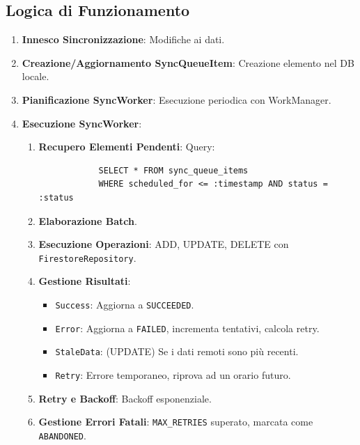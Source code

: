 \documentclass{article}
\begin{document}
\subsection{Logica di Funzionamento}\label{subsec:logica-di-funzionamento}
\begin{enumerate}
    \item \textbf{Innesco Sincronizzazione}: Modifiche ai dati.
    \item \textbf{Creazione/Aggiornamento SyncQueueItem}: Creazione elemento nel
    DB locale.
    \item \textbf{Pianificazione SyncWorker}: Esecuzione periodica con
    WorkManager.
    \item \textbf{Esecuzione SyncWorker}:
        \begin{enumerate}
            \item \textbf{Recupero Elementi Pendenti}: Query:
            \begin{verbatim}
            SELECT * FROM sync_queue_items
            WHERE scheduled_for <= :timestamp AND status = :status
            \end{verbatim}
            \item \textbf{Elaborazione Batch}.
            \item \textbf{Esecuzione Operazioni}: ADD, UPDATE, DELETE con
            \texttt{FirestoreRepository}.
            \item \textbf{Gestione Risultati}:
            \begin{itemize}
                \item \texttt{Success}: Aggiorna a \texttt{SUCCEEDED}.
                \item \texttt{Error}: Aggiorna a \texttt{FAILED}, incrementa
                tentativi, calcola retry.
                \item \texttt{StaleData}: (UPDATE) Se i dati remoti sono più
                recenti.
                \item \texttt{Retry}: Errore temporaneo, riprova ad un orario
                futuro.
            \end{itemize}
            \item \textbf{Retry e Backoff}: Backoff esponenziale.
            \item \textbf{Gestione Errori Fatali}: \texttt{MAX\_RETRIES}
            superato, marcata come \texttt{ABANDONED}.
        \end{enumerate}
\end{enumerate}
\end{document}
